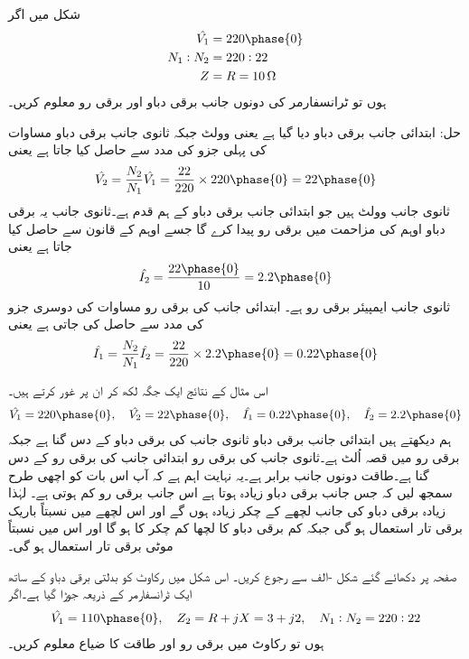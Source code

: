 	شکل    میں اگر
\begin{align*}
\hat{V_1}&=220 \phase{0}\\
N_1:N_2&=220:22\\
Z&=R=\SI{10}{\ohm}
\end{align*}
ہوں تو ٹرانسفارمر کی دونوں جانب برقی دباو اور برقی رو معلوم کریں۔

حل:
ابتدائی جانب برقی دباو دیا گیا ہے یعنی  وولٹ جبکہ ثانوی جانب برقی دباو مساوات  کی پہلی جزو کی مدد سے حاصل کیا جاتا ہے یعنی
\begin{align*}
\hat{V_2}=\frac{N_2}{N_1} \hat{V_1}=\frac{22}{220} \times 220\phase {0}=22\phase{0}
\end{align*}
ثانوی جانب  وولٹ ہیں جو ابتدائی جانب برقی دباو کے ہم قدم ہے۔ثانوی جانب یہ برقی دباو  اوہم کی مزاحمت میں برقی رو پیدا کرے گا جسے اوہم کے قانون سے حاصل کیا جاتا ہے یعنی
\begin{align*}
\hat{I_2}=\frac{22 \phase {0}}{10}=2.2\phase {0}
\end{align*}
ثانوی جانب  ایمپیئر برقی رو ہے۔ ابتدائی جانب کی برقی رو مساوات  کی دوسری جزو کی مدد سے حاصل کی جاتی ہے یعنی
\begin{align*}
\hat{I_1}=\frac{N_2}{N_1} \hat{I_2}=\frac{22}{220} \times 2.2\phase{0}=0.22\phase{0}
\end{align*}

اس مثال کے نتائج ایک جگہ لکھ کر ان پر غور کرتے ہیں۔
\begin{align*}
\hat{V_1}=220\phase{0}, \quad \hat{V_2}=22\phase{0}, \quad \hat{I_1}=0.22\phase{0}, \quad \hat{I_2}=2.2\phase{0}
\end{align*}
ہم دیکھتے ہیں ابتدائی جانب برقی دباو ثانوی جانب کی برقی دباو کے دس گنا ہے جبکہ برقی رو میں قصہ اُلٹ ہے۔ثانوی جانب کی برقی رو ابتدائی جانب کی برقی رو کے دس گنا ہے۔طاقت دونوں جانب برابر ہے۔یہ نہایت اہم ہے کہ آپ اس بات کو اچھی طرح سمجھ لیں کہ جس جانب برقی دباو زیادہ ہوتا ہے اس جانب برقی رو کم ہوتی ہے۔ لہٰذا زیادہ برقی دباو کی جانب لچھے کے چکر زیادہ ہوں گے اور اس لچھے میں نسبتاً باریک برقی تار استعمال ہو گی جبکہ کم برقی دباو کا لچھا کم چکر کا ہو گا اور اس میں نسبتاً موٹی برقی تار استعمال ہو گی۔ 

	صفحہ  پر دکھائے گئے شکل -الف سے رجوع کریں۔ اس شکل میں رکاوٹ  کو  بدلتی برقی دباو  کے ساتھ ایک ٹرانسفارمر کے ذریعہ جوڑا گیا ہے۔اگر
\begin{align*}
\hat{V_1}=110\phase{0},\quad Z_2=R+j X=3+j 2,\quad N_1:N_2=220:22 
\end{align*}
ہوں تو رکاوٹ میں برقی رو اور طاقت کا ضیاع معلوم کریں۔

